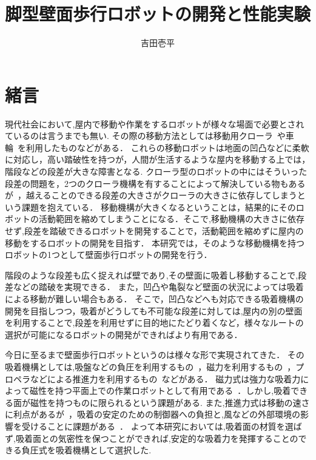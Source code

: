\documentclass[uplatex,dvipdfmx]{jlreq}
\title{脚型壁面歩行ロボットの開発と性能実験}
\author{吉田壱平}
\begin{document}
\maketitle
\thispagestyle{empty}
\section{緒言}
現代社会において,屋内で移動や作業をするロボットが様々な場面で必要とされているのは言うまでも無い.
その際の移動方法としては移動用クローラ~\cite{小柳栄次2010サブクローラを持つレスキューロボット}や車輪~\cite{尾崎功一20082p2}を利用したものなどがある．
これらの移動ロボットは地面の凹凸などに柔軟に対応し，高い踏破性を持つが，人間が生活するような屋内を移動する上では，階段などの段差が大きな障害となる.
クローラ型のロボットの中にはそういった段差の問題を，2つのクローラ機構を有することによって解決している物もあるが~\cite{小柳栄次2010サブクローラを持つレスキューロボット}，越えることのできる段差の大きさがクローラの大きさに依存してしまうという課題を抱えている．
移動機構が大きくなるということは，結果的にそのロボットの活動範囲を縮めてしまうことになる．そこで,移動機構の大きさに依存せず,段差を踏破できるロボットを開発することで，活動範囲を縮めずに屋内の移動をするロボットの開発を目指す．
本研究では，そのような移動機構を持つロボットの1つとして壁面歩行ロボットの開発を行う．

階段のような段差も広く捉えれば壁であり,その壁面に吸着し移動することで,段差などの踏破を実現できる．
また，凹凸や亀裂など壁面の状況によっては吸着による移動が難しい場合もある．
そこで，凹凸などへも対応できる吸着機構の開発を目指しつつ，吸着がどうしても不可能な段差に対しては,屋内の別の壁面を利用することで,段差を利用せずに目的地にたどり着くなど，様々なルートの選択が可能になるロボットの開発ができればより有用である．

今日に至るまで壁面歩行ロボットというのは様々な形で実現されてきた．
その吸着機構としては,吸盤などの負圧を利用するもの~\cite{広瀬茂男1991四足壁面移動ロボット}，磁力を利用するもの~\cite{高田洋吾2013立体的な環境で活動できる橋梁検査ロボットの開発}，プロペラなどによる推進力を利用するもの~\cite{weko_4205_1}などがある．
磁力式は強力な吸着力によって磁性を持つ平面上での作業ロボットとして有用である~\cite{高田洋吾2013立体的な環境で活動できる橋梁検査ロボットの開発}．しかし,吸着できる面が磁性を持つものに限られるという課題がある.
また,推進力式は移動の速さに利点があるが~\cite{weko_4205_1}，吸着の安定のための制御器への負担と,風などの外部環境の影響を受けることに課題がある~\cite{西亮1991推進力による壁面移動ロボットの研究,鈴木隆宏2009g1501}．
よって本研究においては,吸着面の材質を選ばず,吸着面との気密性を保つことができれば,安定的な吸着力を発揮することのできる負圧式を吸着機構として選択した.
\end{document}
